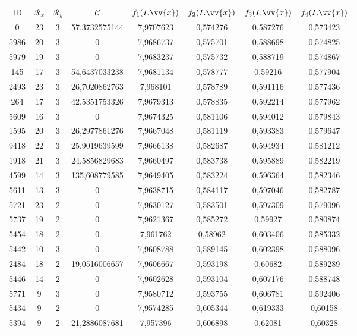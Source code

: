 \scriptsize
\begin{longtable}{|c|c|c|c|c|c|c|c|}
\hline
ID & $\mathscr{R}_x$ & $\mathscr{R}_y$ & $\mathscr{C}$ & $f_1(I.\vv{x})$ & $f_2(I.\vv{x})$ & $f_3(I.\vv{x})$ & $f_4(I.\vv{x})$ \\
0 & 23 & 3 & 57,3732575144 & 7,9707623 & 0,574276 & 0,587276 & 0,573423 \\
5986 & 20 & 3 & 0 & 7,9686737 & 0,575701 & 0,588698 & 0,574825 \\
5979 & 19 & 3 & 0 & 7,9683237 & 0,575732 & 0,588719 & 0,574867 \\
145 & 17 & 3 & 54,6437033238 & 7,9681134 & 0,578777 & 0,59216 & 0,577904 \\
2493 & 23 & 3 & 26,7020862763 & 7,968101 & 0,578789 & 0,591116 & 0,577436 \\
264 & 17 & 3 & 42,5351753326 & 7,9679313 & 0,578835 & 0,592214 & 0,577962 \\
5609 & 16 & 3 & 0 & 7,9674325 & 0,581106 & 0,594012 & 0,579843 \\
1595 & 20 & 3 & 26,2977861276 & 7,9667048 & 0,581119 & 0,593383 & 0,579647 \\
9418 & 22 & 3 & 25,9019639599 & 7,9666138 & 0,582687 & 0,594934 & 0,581212 \\
1918 & 21 & 3 & 24,5856829683 & 7,9660497 & 0,583738 & 0,595889 & 0,582219 \\
4599 & 14 & 3 & 135,608779585 & 7,9649405 & 0,583224 & 0,596364 & 0,582346 \\
5611 & 13 & 3 & 0 & 7,9638715 & 0,584117 & 0,597046 & 0,582787 \\
5721 & 23 & 2 & 0 & 7,9630127 & 0,583501 & 0,597309 & 0,579096 \\
5737 & 19 & 2 & 0 & 7,9621367 & 0,585272 & 0,59927 & 0,580874 \\
5454 & 18 & 2 & 0 & 7,961762 & 0,58962 & 0,603406 & 0,585332 \\
5442 & 10 & 3 & 0 & 7,9608788 & 0,589145 & 0,602398 & 0,588096 \\
2484 & 18 & 2 & 19,0516006657 & 7,9606667 & 0,593198 & 0,60682 & 0,589289 \\
5446 & 14 & 2 & 0 & 7,9602628 & 0,593104 & 0,607176 & 0,588748 \\
5771 & 9 & 3 & 0 & 7,9580712 & 0,593755 & 0,606781 & 0,592406 \\
5434 & 9 & 2 & 0 & 7,9574285 & 0,605344 & 0,619333 & 0,60158 \\
5394 & 9 & 2 & 21,2886087681 & 7,957396 & 0,606898 & 0,62081 & 0,60328 \\

\end{longtable}
